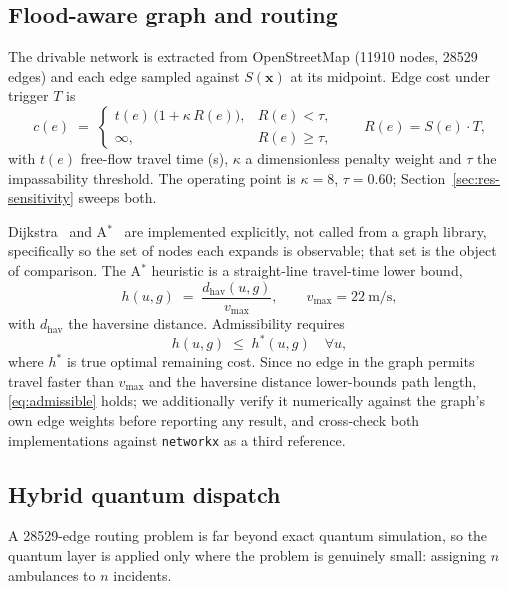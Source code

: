 \documentclass[journal]{IEEEtran}
\newcommand{\Sx}{S(\mathbf{x})}
\begin{document}
\subsection{Flood-aware graph and routing}
\label{sec:method-routing}
The drivable network is extracted from OpenStreetMap (\num{11910} nodes,
\num{28529} edges) and each edge sampled against $\Sx$ at its midpoint. Edge cost
under trigger $T$ is
\begin{equation}
c(e) \;=\;
\begin{cases}
t(e)\,\bigl(1+\kappa\,R(e)\bigr), & R(e) < \tau,\\[2pt]
\infty, & R(e) \ge \tau,
\end{cases}
\qquad R(e) = S(e)\cdot T,
\label{eq:edgecost}
\end{equation}
with $t(e)$ free-flow travel time (\si{\second}), $\kappa$ a dimensionless
penalty weight and $\tau$ the impassability threshold. The operating point is
$\kappa=8$, $\tau=0.60$; Section~\ref{sec:res-sensitivity} sweeps both.

Dijkstra~\citep{dijkstra1959} and A$^\ast$~\citep{hart1968} are implemented
explicitly, not called from a graph library, specifically so the set of
nodes each expands is observable; that set is the object of comparison. The
A$^\ast$ heuristic is a straight-line travel-time lower bound,
\begin{equation}
h(u,g) \;=\; \frac{d_{\mathrm{hav}}(u,g)}{v_{\max}},
\qquad v_{\max}=\SI{22}{\metre\per\second},
\label{eq:heuristic}
\end{equation}
with $d_{\mathrm{hav}}$ the haversine distance. Admissibility requires
\begin{equation}
h(u,g) \;\le\; h^{*}(u,g) \quad \forall u,
\label{eq:admissible}
\end{equation}
where $h^{*}$ is true optimal remaining cost. Since no edge in the graph permits
travel faster than $v_{\max}$ and the haversine distance lower-bounds path
length, \eqref{eq:admissible} holds; we additionally verify it numerically
against the graph's own edge weights before reporting any result, and cross-check
both implementations against \texttt{networkx} as a third reference.

\subsection{Hybrid quantum dispatch}
\label{sec:method-qaoa}
A \num{28529}-edge routing problem is far beyond exact quantum simulation, so the
quantum layer is applied only where the problem is genuinely small: assigning
$n$ ambulances to $n$ incidents.
\end{document}

